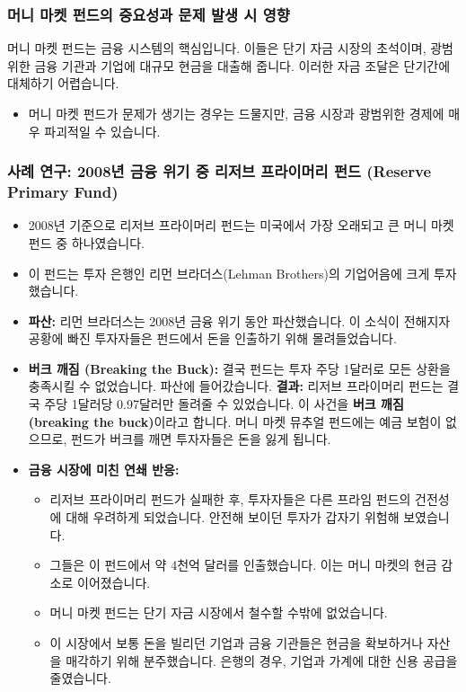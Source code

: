 \documentclass[11pt,a4paper]{book}
\theoremstyle{definition}
\begin{document}
\subsubsection*{머니 마켓 펀드의 중요성과 문제 발생 시 영향}
머니 마켓 펀드는 금융 시스템의 핵심입니다. 이들은 단기 자금 시장의 초석이며, 광범위한 금융 기관과 기업에 대규모 현금을 대출해 줍니다. 이러한 자금 조달은 단기간에 대체하기 어렵습니다.

\begin{itemize}
    \item 머니 마켓 펀드가 문제가 생기는 경우는 드물지만, 금융 시장과 광범위한 경제에 매우 파괴적일 수 있습니다.
\end{itemize}

\subsubsection*{사례 연구: 2008년 금융 위기 중 리저브 프라이머리 펀드 (Reserve Primary Fund)}
\begin{itemize}
    \item 2008년 기준으로 리저브 프라이머리 펀드는 미국에서 가장 오래되고 큰 머니 마켓 펀드 중 하나였습니다.
    \item 이 펀드는 투자 은행인 리먼 브라더스(Lehman Brothers)의 기업어음에 크게 투자했습니다.
    \item \textbf{파산:} 리먼 브라더스는 2008년 금융 위기 동안 파산했습니다. 이 소식이 전해지자 공황에 빠진 투자자들은 펀드에서 돈을 인출하기 위해 몰려들었습니다.
    \item \textbf{버크 깨짐 (Breaking the Buck):} 결국 펀드는 투자 주당 1달러로 모든 상환을 충족시킬 수 없었습니다. 파산에 들어갔습니다.
    \textbf{결과:} 리저브 프라이머리 펀드는 결국 주당 1달러당 0.97달러만 돌려줄 수 있었습니다. 이 사건을 \textbf{버크 깨짐 (breaking the buck)}이라고 합니다. 머니 마켓 뮤추얼 펀드에는 예금 보험이 없으므로, 펀드가 버크를 깨면 투자자들은 돈을 잃게 됩니다.
    \item \textbf{금융 시장에 미친 연쇄 반응:}
    \begin{itemize}
        \item 리저브 프라이머리 펀드가 실패한 후, 투자자들은 다른 프라임 펀드의 건전성에 대해 우려하게 되었습니다. 안전해 보이던 투자가 갑자기 위험해 보였습니다.
        \item 그들은 이 펀드에서 약 4천억 달러를 인출했습니다. 이는 머니 마켓의 현금 감소로 이어졌습니다.
        \item 머니 마켓 펀드는 단기 자금 시장에서 철수할 수밖에 없었습니다.
        \item 이 시장에서 보통 돈을 빌리던 기업과 금융 기관들은 현금을 확보하거나 자산을 매각하기 위해 분주했습니다. 은행의 경우, 기업과 가계에 대한 신용 공급을 줄였습니다.
    \end{itemize}
\end{itemize}
\end{document}
